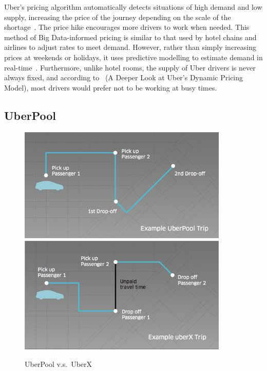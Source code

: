         Uber's pricing algorithm automatically detects situations of high demand and low supply, increasing the price of the journey depending on the scale of the shortage~\parencite{dan2014}. The price hike encourages more drivers to work when needed. This method of Big Data-informed pricing is similar to that used by hotel chains and airlines to adjust rates to meet demand. However, rather than simply increasing prices at weekends or holidays, it uses predictive modelling to estimate demand in real-time~\parencite{marr2015}. Furthermore, unlike hotel rooms, the supply of Uber drivers is never always fixed, and according to~\cite{gurley2014} (A Deeper Look at Uber's Dynamic Pricing Model), most drivers would prefer not to be working at busy times.

      \subsection{UberPool}\label{subsec:uber_pool}

        \begin{figure}
          \centering
          \begin{minipage}{10cm}
            \centering
            \includegraphics[width=10cm]{inc/uber_pool.png}
            \includegraphics[width=10cm]{inc/uber_x.png}
            \caption[UberPool v.s.\ UberX]{UberPool v.s.\ UberX~\parencite{uber2014}}
            \label{fig:uber_pool_vs_uber_x}
          \end{minipage}
        \end{figure}

